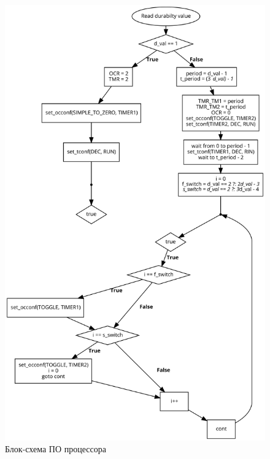 \documentclass[12pt, a4paper] {ncc}
\begin{document}
\newpage
\begin{figure}[h!]
    \includegraphics[scale=0.3]{./flowchart.png}
	\caption{Блок-схема ПО процессора}
	\label{flowchart}
\end{figure}

\clearpage
\end{document}
